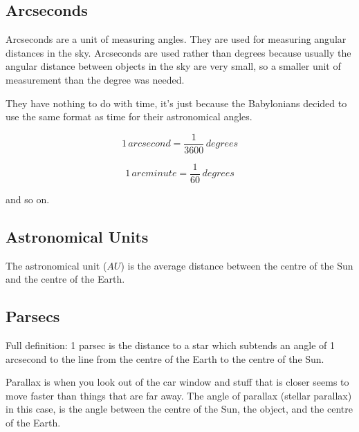 \documentclass[a4paper, 12pt]{article}
\begin{document}
\subsection {Arcseconds}

Arcseconds are a unit of measuring angles. They are used for measuring angular distances in the sky. Arcseconds are used rather than degrees because usually the angular distance between objects in the sky are very small, so a smaller unit of measurement than the degree was needed.

They have nothing to do with time, it's just because the Babylonians decided to use the same format as time for their astronomical angles.

$$
1 \, arcsecond = \frac{1}{3600} \, degrees
$$

$$
1 \, arcminute = \frac{1}{60} \, degrees
$$

and so on.

\subsection{Astronomical Units}

The astronomical unit ($AU$) is the average distance between the centre of the Sun and the centre of the Earth.

\subsection{Parsecs}

Full definition: 1 parsec is the distance to a star which subtends an angle of 1 arcsecond to the line from the centre of the Earth to the centre of the Sun.

Parallax is when you look out of the car window and stuff that is closer seems to move faster than things that are far away. The angle of parallax (stellar parallax) in this case, is the angle between the centre of the Sun, the object, and the centre of the Earth.
\end{document}
